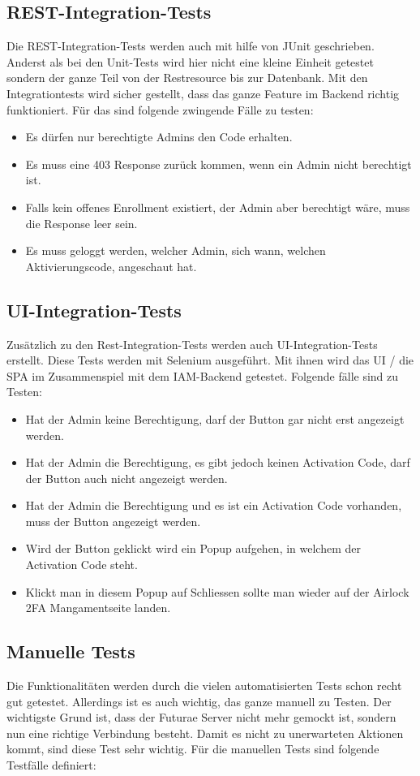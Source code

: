 \subsection{REST-Integration-Tests}
Die REST-Integration-Tests werden auch mit hilfe von JUnit geschrieben. Anderst als bei den Unit-Tests wird hier nicht eine kleine Einheit getestet sondern der ganze Teil von der Restresource bis zur Datenbank.
Mit den Integrationtests wird sicher gestellt, dass das ganze Feature im Backend richtig funktioniert. Für das sind folgende zwingende Fälle zu testen:

\begin{itemize}
	\item Es dürfen nur berechtigte Admins den Code erhalten.
	\item Es muss eine 403 Response zurück kommen, wenn ein Admin nicht berechtigt ist.
	\item Falls kein offenes Enrollment existiert, der Admin aber berechtigt wäre, muss die Response leer sein.
	\item Es muss geloggt werden, welcher Admin, sich wann, welchen Aktivierungscode, angeschaut hat.
\end{itemize}

\subsection{UI-Integration-Tests}
Zusätzlich zu den Rest-Integration-Tests werden auch UI-Integration-Tests erstellt. Diese Tests werden mit Selenium ausgeführt. Mit ihnen wird das UI / die SPA im Zusammenspiel mit dem IAM-Backend getestet.
Folgende fälle sind zu Testen:
\begin{itemize}
	\item Hat der Admin keine Berechtigung, darf der Button gar nicht erst angezeigt werden.
	\item Hat der Admin die Berechtigung, es gibt jedoch keinen Activation Code, darf der Button auch nicht angezeigt werden.
	\item Hat der Admin die Berechtigung und es ist ein Activation Code vorhanden, muss der Button angezeigt werden.
	\item Wird der Button geklickt wird ein Popup aufgehen, in welchem der Activation Code steht.
	\item Klickt man in diesem Popup auf Schliessen sollte man wieder auf der Airlock 2FA Mangamentseite landen.
\end{itemize}
\newpage

\subsection{Manuelle Tests} \label{subsec:mtests}
Die Funktionalitäten werden durch die vielen automatisierten Tests schon recht gut getestet. Allerdings ist es auch wichtig, das ganze manuell zu Testen. Der wichtigste Grund ist, dass der Futurae Server nicht mehr gemockt ist, sondern nun eine richtige Verbindung besteht. Damit es nicht zu unerwarteten Aktionen kommt, sind diese Test sehr wichtig. Für die manuellen Tests sind folgende Testfälle definiert:

